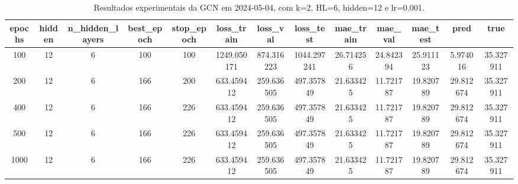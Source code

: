 \begin{table}[h]
\centering
\caption{Resultados experimentais da GCN em 2024-05-04, com k=2, HL=6, hidden=12 e lr=0.001.}
\label{tab:gcn_results_k2_hl6_h12_d20240504}
\begin{tabular}{ccccccccccccc}
\toprule
epochs & hidden & n\_hidden\_layers & best\_epoch & stop\_epoch & loss\_train & loss\_val & loss\_test & mae\_train & mae\_val & mae\_test & pred & true \\
\midrule
100 & 12 & 6 & 100 & 100 & 1249.050171 & 874.316223 & 1044.297241 & 26.714256 & 24.842394 & 25.911123 & 5.974016 & 35.327911 \\
200 & 12 & 6 & 166 & 200 & 633.459412 & 259.636505 & 497.357849 & 21.633425 & 11.721787 & 19.820789 & 29.812674 & 35.327911 \\
400 & 12 & 6 & 166 & 226 & 633.459412 & 259.636505 & 497.357849 & 21.633425 & 11.721787 & 19.820789 & 29.812674 & 35.327911 \\
500 & 12 & 6 & 166 & 226 & 633.459412 & 259.636505 & 497.357849 & 21.633425 & 11.721787 & 19.820789 & 29.812674 & 35.327911 \\
1000 & 12 & 6 & 166 & 226 & 633.459412 & 259.636505 & 497.357849 & 21.633425 & 11.721787 & 19.820789 & 29.812674 & 35.327911 \\
\bottomrule
\end{tabular}
\end{table}
